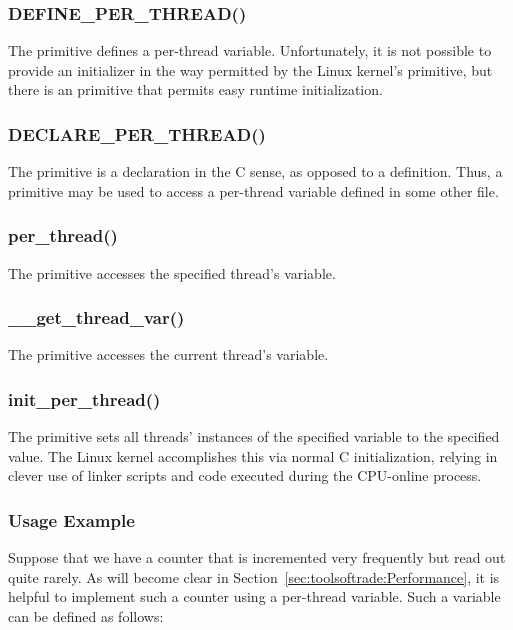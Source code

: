 \subsubsection{DEFINE\_PER\_THREAD()}

The  primitive defines a per-thread variable.
Unfortunately, it is not possible to provide an initializer in the way
permitted by the Linux kernel's  primitive,
but there is an  primitive that permits easy
runtime initialization.

\subsubsection{DECLARE\_PER\_THREAD()}

The  primitive is a declaration in the C sense,
as opposed to a definition.
Thus, a  primitive may be used to access
a per-thread variable defined in some other file.

\subsubsection{per\_thread()}

The  primitive accesses the specified thread's variable.

\subsubsection{\_\_get\_thread\_var()}

The  primitive accesses the current thread's variable.

\subsubsection{init\_per\_thread()}

The  primitive sets all threads' instances of
the specified variable to the specified value.
The Linux kernel accomplishes this via normal C initialization,
relying in clever use of linker scripts and code executed during
the CPU-online process.

\subsubsection{Usage Example}

Suppose that we have a counter that is incremented very frequently
but read out quite rarely.
As will become clear in
Section~\ref{sec:toolsoftrade:Performance},
it is helpful to implement such a counter using a per-thread variable.
Such a variable can be defined as follows:

